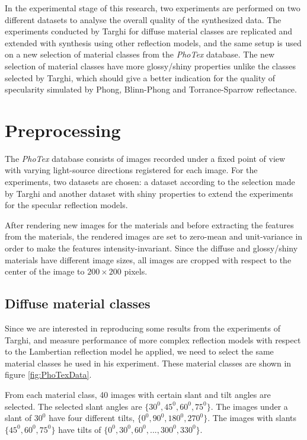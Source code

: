 \hypertarget{experiments}{
}

In the experimental stage of this research, two experiments are performed on two different datasets to analyse the overall quality of the synthesized data. The experiments conducted by Targhi for diffuse material classes are replicated and extended with synthesis using other reflection models, and the same setup is used on a new selection of material classes from the {\it PhoTex} database. The new selection of material classes have more glossy/shiny properties unlike the classes selected by Targhi, which should give a better indication for the quality of specularity simulated by Phong, Blinn-Phong and Torrance-Sparrow reflectance. 

\section{Preprocessing}\label{sec:preprocessing}
The {\it PhoTex} database consists of images recorded under a fixed point of view with varying light-source directions registered for each image. For the experiments, two datasets are chosen: a dataset according to the selection made by Targhi and another dataset with shiny properties to extend the experiments for the specular reflection models. 

After rendering new images for the materials and before extracting the features from the materials, the rendered images are set to zero-mean and unit-variance in order to make the features intensity-invariant. Since the diffuse and glossy/shiny materials have different image sizes, all images are cropped with respect to the center of the image to $200 \times 200$ pixels.

\subsection{Diffuse material classes}
Since we are interested in reproducing some results from the experiments of Targhi, and measure performance of more complex reflection models with respect to the Lambertian reflection model he applied, we need to select the same material classes he used in his experiment. These material classes are shown in figure \ref{fig:PhoTexData}.

From each material class, 40 images with certain slant and tilt angles are selected. The selected slant angles are $\{30^0, 45^0,60^0,75^0\}$. The images under a slant of $30^0$ have four different tilts, $\{0^0, 90^0, 180^0, 270^0\}$. The images with slants $\{45^0,60^0,75^0\}$ have tilts of $\{0^0,30^0,60^0,..., 300^0,330^0\}$. 

